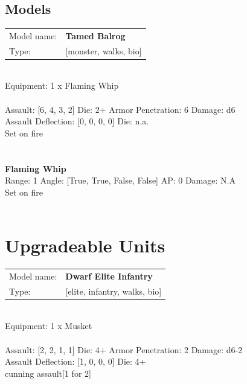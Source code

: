 \clearpage

\subsection{ Models }

\begin{tabular}{ll}
Model name: & {\bf Tamed Balrog } \\
Type: & [monster, walks, bio] \\
\end{tabular}
\ \\
Equipment: 1 x Flaming Whip \\
\ \\
Assault: [6, 4, 3, 2] Die: 2+ Armor Penetration: 6 Damage: d6 \\
Assault Deflection: [0, 0, 0, 0] Die: n.a.\\
\indent Set on fire\\ 
 
\ \\

\ \\
{\bf Flaming Whip } \\



Range: 1  Angle: [True, True, False, False] AP: 0 Damage: N.A \\
Set on fire\\ 




 
\ \\














\section{Upgradeable Units}\begin{tabular}{ll}
Model name: & {\bf Dwarf Elite Infantry } \\
Type: & [elite, infantry, walks, bio] \\
\end{tabular}
\ \\
Equipment: 1 x Musket \\
\ \\
Assault: [2, 2, 1, 1] Die: 4+ Armor Penetration: 2 Damage: d6-2 \\
Assault Deflection: [1, 0, 0, 0] Die: 4+\\
\indent cunning assault[1 for 2]\\ 
 
